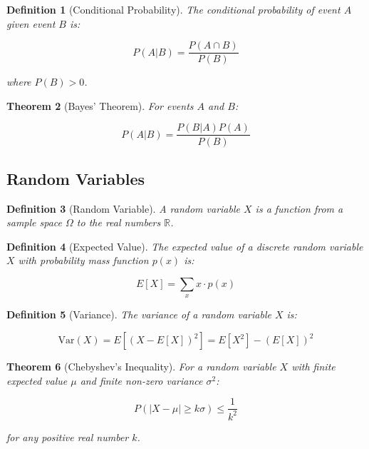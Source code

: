 \documentclass[12pt]{article}
\newif\ifDarkMode
\newcommand{\eqcolor}[1]{\ifDarkMode\textcolor{draculaPurple}{#1}\else#1\fi}
\newcommand{\varcolor}[1]{\ifDarkMode\textcolor{draculaGreen}{#1}\else#1\fi}
\newtheorem{theorem}{Theorem}[section]
\newtheorem{definition}[theorem]{Definition}
\begin{document}
\begin{definition}[Conditional Probability]
The conditional probability of event $\varcolor{A}$ given event $\varcolor{B}$ is:

\[
\eqcolor{P(A|B) = \frac{P(A \cap B)}{P(B)}}
\]

where $\varcolor{P(B) > 0}$.
\end{definition}

\begin{theorem}[Bayes' Theorem]
For events $\varcolor{A}$ and $\varcolor{B}$:

\[
\eqcolor{P(A|B) = \frac{P(B|A)P(A)}{P(B)}}
\]
\end{theorem}

\subsection{\textcolor{draculaYellow}{Random Variables}}

\begin{definition}[Random Variable]
A random variable $\varcolor{X}$ is a function from a sample space $\varcolor{\Omega}$ to the real numbers $\varcolor{\mathbb{R}}$.
\end{definition}

\begin{definition}[Expected Value]
The expected value of a discrete random variable $\varcolor{X}$ with probability mass function $\varcolor{p(x)}$ is:

\[
\eqcolor{E[X] = \sum_x x \cdot p(x)}
\]
\end{definition}

\begin{definition}[Variance]
The variance of a random variable $\varcolor{X}$ is:

\[
\eqcolor{\text{Var}(X) = E[(X - E[X])^2] = E[X^2] - (E[X])^2}
\]
\end{definition}

\begin{theorem}[Chebyshev's Inequality]
For a random variable $\varcolor{X}$ with finite expected value $\varcolor{\mu}$ and finite non-zero variance $\varcolor{\sigma^2}$:

\[
\eqcolor{P(|X - \mu| \geq k\sigma) \leq \frac{1}{k^2}}
\]

for any positive real number $\varcolor{k}$.
\end{theorem}
\end{document}
